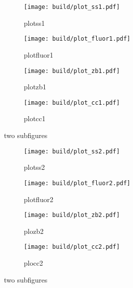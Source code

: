 \begin{figure}[hhh]
  \centering
  \begin{subfigure}{.45\textwidth}
    \centering
    \texttt{[image: build/plot\_ss1.pdf]}
    \caption{plotss1}
    \label{subfig:cool11}
  \end{subfigure}
  \begin{subfigure}{.45\textwidth}
    \centering
    \texttt{[image: build/plot\_fluor1.pdf]}
    \caption{plotfluor1}
    \label{subfig:cool12}
  \end{subfigure}
  \begin{subfigure}{.45\textwidth}
    \centering
    \texttt{[image: build/plot\_zb1.pdf]}
    \caption{plotzb1}
    \label{subfig:cool13}
  \end{subfigure}
  \begin{subfigure}{.45\textwidth}
    \centering
    \texttt{[image: build/plot\_cc1.pdf]}
    \caption{plotcc1}
    \label{subfig:cool14}
  \end{subfigure}
  \caption{two subfigures}
  \label{fig:very cool1}
\end{figure}

\begin{figure}[hhh]
  \centering
  \begin{subfigure}{.45\textwidth}
    \centering
    \texttt{[image: build/plot\_ss2.pdf]}
    \caption{plotss2}
    \label{subfig:cool21}
  \end{subfigure}
  \begin{subfigure}{.45\textwidth}
    \centering
    \texttt{[image: build/plot\_fluor2.pdf]}
    \caption{plotfluor2}
    \label{subfig:cool22}
  \end{subfigure}
  \begin{subfigure}{.45\textwidth}
    \centering
    \texttt{[image: build/plot\_zb2.pdf]}
    \caption{plozb2}
    \label{subfig:cool23}
  \end{subfigure}
  \begin{subfigure}{.45\textwidth}
    \centering
    \texttt{[image: build/plot\_cc2.pdf]}
    \caption{plocc2}
    \label{subfig:cool24}
  \end{subfigure}
  \caption{two subfigures}
  \label{fig:very cool2}
\end{figure}
